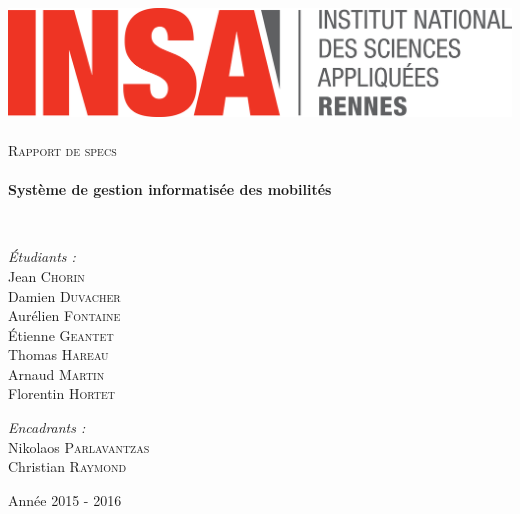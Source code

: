 \begin{titlepage}
		\begin{sffamily}
			\begin{center}
				
				\includegraphics[width=400pt]{logo_INSA.png}~\\[2.5cm]
				
				\textsc{\huge Rapport de specs}\\[2.5cm]
				
				\HRule \\[0.4cm]
				{ \huge \bfseries Système de gestion informatisée des mobilités\\[0.4cm] }
				
				\HRule \\[4cm]
				
				\begin{minipage}{0.4\textwidth}
					\begin{flushleft} \large
						\emph{Étudiants :}\\
						Jean \textsc{Chorin}\\
						Damien \textsc{Duvacher}\\
						Aurélien \textsc{Fontaine}\\
						Étienne \textsc{Geantet}\\
						Thomas \textsc{Hareau}\\
						Arnaud \textsc{Martin}\\
						Florentin \textsc{Hortet}\\
					\end{flushleft}
				\end{minipage}
				\begin{minipage}{0.5\textwidth}
					\begin{flushright} \large
						\emph{Encadrants :} \\
						Nikolaos \textsc{Parlavantzas}\\
						Christian \textsc{Raymond}
					\end{flushright}
				\end{minipage}
				
				\vfill
				
				{\large Année 2015 - 2016}
				
			\end{center}
		\end{sffamily}
	\end{titlepage}